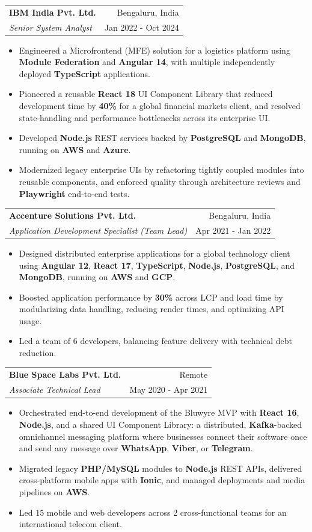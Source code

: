 \documentclass[letterpaper,11pt]{article}
\makeatletter
\newcommand{\resumeItemPlain}[1]{
  \item\small{#1 \vspace{-2.5pt}}
}
\newcommand{\resumeSubheading}[4]{
  \vspace{2.5pt}\item[]
    \begin{tabular*}{0.97\textwidth}{l@{\extracolsep{\fill}}r}
      \textbf{#1} & #2 \\
      \textit{\small#3} & \small #4 \\
    \end{tabular*}\vspace{-5pt}
}
\newcommand{\resumeItemListStart}{
\begin{itemize}[
leftmargin=*,
label=$\circ$,
itemsep=1pt,
parsep=0pt,
topsep=2pt
]}
\newcommand{\resumeItemListEnd}{\end{itemize}\vspace{2pt}}
\makeatother
\begin{document}
    \resumeSubheading
      {IBM India Pvt. Ltd.}{Bengaluru, India}
      {Senior System Analyst}{Jan 2022 - Oct 2024}
      \resumeItemListStart
        \resumeItemPlain{Engineered a Microfrontend (MFE) solution for a logistics platform using \textbf{Module Federation} and \textbf{Angular 14}, with multiple independently deployed \textbf{TypeScript} applications.}
        \resumeItemPlain{Pioneered a reusable \textbf{React 18} UI Component Library that reduced development time by \textbf{40\%} for a global financial markets client, and resolved state-handling and performance bottlenecks across its enterprise UI.}
        \resumeItemPlain{Developed \textbf{Node.js} REST services backed by \textbf{PostgreSQL} and \textbf{MongoDB}, running on \textbf{AWS} and \textbf{Azure}.}
        \resumeItemPlain{Modernized legacy enterprise UIs by refactoring tightly coupled modules into reusable components, and enforced quality through architecture reviews and \textbf{Playwright} end-to-end tests.}
      \resumeItemListEnd

    \resumeSubheading
      {Accenture Solutions Pvt. Ltd.}{Bengaluru, India}
      {Application Development Specialist (Team Lead)}{Apr 2021 - Jan 2022}
      \resumeItemListStart
        \resumeItemPlain{Designed distributed enterprise applications for a global technology client using \textbf{Angular 12}, \textbf{React 17}, \textbf{TypeScript}, \textbf{Node.js}, \textbf{PostgreSQL}, and \textbf{MongoDB}, running on \textbf{AWS} and \textbf{GCP}.}
        \resumeItemPlain{Boosted application performance by \textbf{30\%} across LCP and load time by modularizing data handling, reducing render times, and optimizing API usage.}
        \resumeItemPlain{Led a team of 6 developers, balancing feature delivery with technical debt reduction.}
      \resumeItemListEnd

    \resumeSubheading
      {Blue Space Labs Pvt. Ltd.}{Remote}
      {Associate Technical Lead}{May 2020 - Apr 2021}
      \resumeItemListStart
        \resumeItemPlain{Orchestrated end-to-end development of the Bluwyre MVP with \textbf{React 16}, \textbf{Node.js}, and a shared UI Component Library: a distributed, \textbf{Kafka}-backed omnichannel messaging platform where businesses connect their software once and send any message over \textbf{WhatsApp}, \textbf{Viber}, or \textbf{Telegram}.}
        \resumeItemPlain{Migrated legacy \textbf{PHP/MySQL} modules to \textbf{Node.js} REST APIs, delivered cross-platform mobile apps with \textbf{Ionic}, and managed deployments and media pipelines on \textbf{AWS}.}
        \resumeItemPlain{Led 15 mobile and web developers across 2 cross-functional teams for an international telecom client.}
      \resumeItemListEnd
\end{document}
